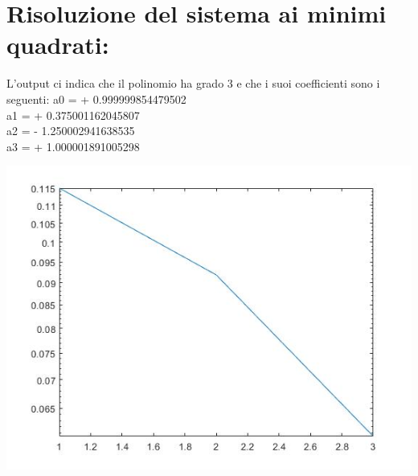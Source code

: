 \section*{Risoluzione del sistema ai minimi quadrati:}
\newpage
\noindent L'output ci indica che il polinomio ha grado 3 e che i suoi coefficienti sono i seguenti:\newline
a0 = + 0.999999854479502\\
a1 = + 0.375001162045807\\
a2 = - 1.250002941638535\\
a3 = + 1.000001891005298

\includegraphics[width=1\linewidth]{img/21Norma.jpg}

